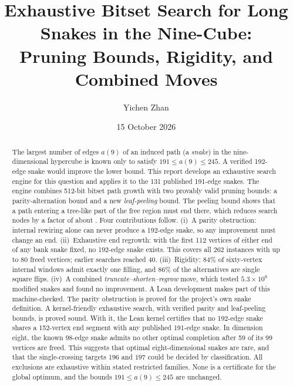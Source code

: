 \documentclass[11pt,a4paper]{article}
\title{Exhaustive Bitset Search for Long Snakes in the Nine-Cube:\\
Pruning Bounds, Rigidity, and Combined Moves}
\author{Yichen Zhan}
\date{15 October 2026}
\theoremstyle{definition}
\begin{document}
\maketitle

\begin{abstract}
The largest number of edges $a(9)$ of an induced path (a \emph{snake}) in the nine-dimensional hypercube is known only to satisfy $191\le a(9)\le 245$. A verified 192-edge snake would improve the lower bound. This report develops an exhaustive search engine for this question and applies it to the 131 published 191-edge snakes. The engine combines 512-bit bitset path growth with two provably valid pruning bounds: a parity-alternation bound and a new \emph{leaf-peeling} bound. The peeling bound shows that a path entering a tree-like part of the free region must end there, which reduces search nodes by a factor of about \PeelRatio. Four contributions follow.
(i)~A parity obstruction: internal rewiring alone can never produce a 192-edge snake, so any improvement must change an end.
(ii)~Exhaustive end regrowth: with the first 112 vertices of either end of any bank snake fixed, no 192-edge snake exists. This covers all $262$ instances with up to 80 freed vertices; earlier searches reached 40.
(iii)~Rigidity: 84\% of sixty-vertex internal windows admit exactly one filling, and 86\% of the alternatives are single square flips.
(iv)~A combined \emph{truncate--shorten--regrow} move, which tested $5.3\times10^{8}$ modified snakes and found no improvement.
A Lean development makes part of this machine-checked. The parity obstruction is proved for the project's own snake definition. A kernel-friendly exhaustive search, with verified parity and leaf-peeling bounds, is proved sound. With it, the Lean kernel certifies that no 192-edge snake shares a 152-vertex end segment with any published 191-edge snake. In dimension eight, the known 98-edge snake admits no other optimal completion after 59 of its 99 vertices are freed. This suggests that optimal eight-dimensional snakes are rare, and that the single-crossing targets $196$ and $197$ could be decided by classification. All exclusions are exhaustive within stated restricted families. None is a certificate for the global optimum, and the bounds $191\le a(9)\le245$ are unchanged.
\end{abstract}

\tableofcontents
\clearpage
{}

\end{document}
